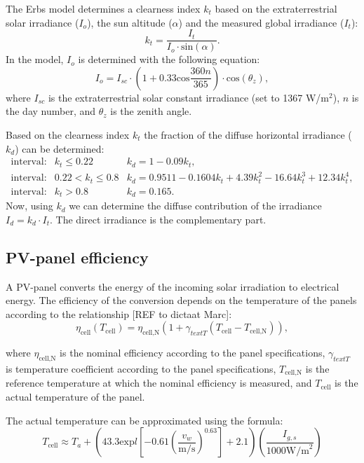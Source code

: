 The Erbs model determines a clearness index $k_t$ based on the extraterrestrial solar irradiance ($I_o$), the sun altitude ($\alpha$) and the measured global irradiance ($I_t$):
\begin{equation}
	k_t = \frac{I_t}{I_o\cdot \text{sin}\left(\alpha\right)}.
\end{equation}
In the model, $I_o$ is determined with the following equation:
\begin{equation}
	I_o = I_{sc} \cdot \left(1 + 0.33\text{cos}\frac{360n}{365}\right)\cdot \text{cos}\left(\theta_z\right) ,
\end{equation}
where $I_{sc}$ is the extraterrestrial solar constant irradiance (set to 1367 W/$\text{m}^2$), $n$ is the day number, and $\theta_z$ is the zenith angle.

Based on the clearness index $k_t$ the fraction of the diffuse horizontal irradiance ($k_d$) can be determined:
\begin{eqnarray}
	\text{interval:} & k_t \leq 0.22 & k_d = 1 - 0.09k_t ,\\
	\text{interval:} & 0.22 < k_t \leq 0.8 & k_d = 0.9511 - 0.1604 k_t + 4.39 k_t^2 -16.64 k_t^3 + 12.34 k_t^4 , \\
	\text{interval:} & k_t > 0.8 & k_d = 0.165 .
\label{eq:diffuse_fraction}
\end{eqnarray} 
Now, using $k_d$ we can determine the diffuse contribution  of the irradiance $I_d = k_d \cdot I_t$. The direct irradiance is the complementary part. 


\subsection{PV-panel efficiency}
A PV-panel converts the energy of the incoming solar irradiation to electrical energy. The efficiency of the conversion depends on the temperature of the panels according to the relationship [REF to dictaat Marc]:
\begin{equation}
  \eta_{\text{cell}}(T_{\text{cell}}) = \eta_{\text{cell,N}} \left( 1 + \gamma_{text{T}}\left(T_{\text{cell}} - T_{\text{cell,N}} \right) \right),
\end{equation}   

where $\eta_{\text{cell,N}} $ is the nominal efficiency according to the panel specifications, $\gamma_{text{T}}$ is temperature coefficient according to the panel specifications, $T_{\text{cell,N}}$ is the reference temperature at which the nominal efficiency is measured, and $T_{\text{cell}}$ is the actual temperature of the panel. 

The actual temperature can be approximated using the formula:
\begin{equation}
	T_{\text{cell}} \approx T_a + \left( 43.3 \text{exp} l\left[-0.61 \left(\frac{v_w}{\text{m/s}} \right)^{0.63} \right] + 2.1 \right)\left(\frac{I_{g,s}}{1000\text{W/m}^2} \right)
\label{eq:temp_panel}
\end{equation}
